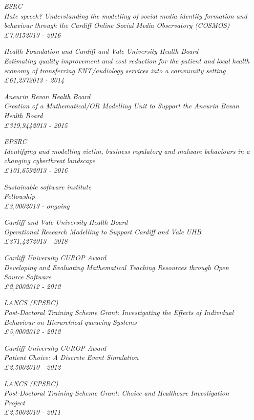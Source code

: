 \documentclass[10pt]{res} %
\begin{document}
\begin{resume}
\sl{ESRC}\\
Hate speech? Understanding the modelling of social media identity formation and behaviour through the Cardiff Online Social Media Observatory (COSMOS)\\
\pounds7,015\hfill{2013 - 2016}

\sl{Health Foundation and Cardiff and Vale University Health Board}\\
Estimating quality improvement and cost reduction for the patient and local health economy of transferring ENT/audiology services into a community setting\\
\pounds61,237\hfill{2013 - 2014}

\sl{Aneurin Bevan Health Board}\\
Creation of a Mathematical/OR Modelling Unit to Support the Aneurin Bevan Health Board\\
\pounds319,944\hfill{2013 - 2015}

\sl{EPSRC}\\
Identifying and modelling victim, business regulatory and malware behaviours in a changing cyberthreat landscape\\
\pounds101,659\hfill{2013 - 2016}

\sl{Sustainable software institute}\\
Fellowship\\
\pounds3,000\hfill{2013 - ongoing}

\sl{Cardiff and Vale University Health Board}\\
Operational Research Modelling to Support Cardiff and Vale UHB\\
\pounds371,427\hfill{2013 - 2018}

\sl{Cardiff University CUROP Award}\\
Developing and Evaluating Mathematical Teaching Resources through Open Source Software\\
\pounds2,200\hfill{2012 - 2012}

\sl{LANCS (EPSRC)}\\
Post-Doctoral Training Scheme Grant: Investigating the Effects of Individual Behaviour on Hierarchical queueing Systems\\
\pounds5,000\hfill{2012 - 2012}

\sl{Cardiff University CUROP Award}\\
Patient Choice: A Discrete Event Simulation\\
\pounds2,500\hfill{2010 - 2012}

\sl{LANCS (EPSRC)}\\
Post-Doctoral Training Scheme Grant: Choice and Healthcare Investigation Project\\
\pounds2,500\hfill{2010 - 2011}


\end{resume}
\end{document}
